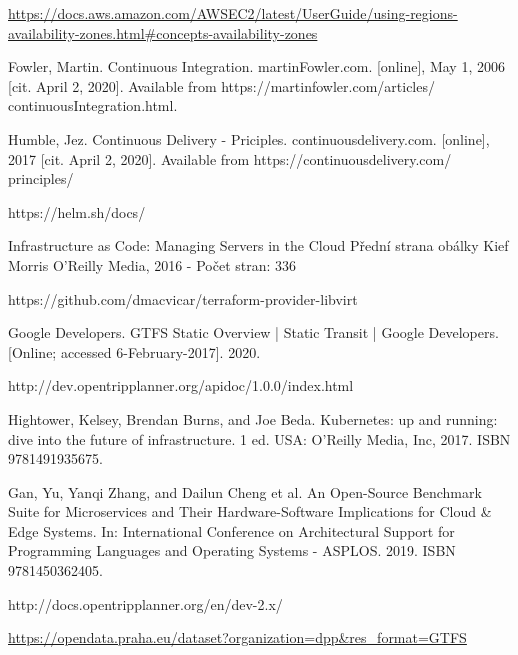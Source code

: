 \documentclass[thesis=M,czech]{FITthesis}[2019/12/23]
\theoremstyle{plain}
\theoremstyle{definition}
\begin{document}
\begin{thebibliography}{9}
\url{https://docs.aws.amazon.com/AWSEC2/latest/UserGuide/using-regions-availability-zones.html#concepts-availability-zones
}


Fowler, Martin. Continuous Integration. martinFowler.com. [online], May 1,
2006 [cit. April 2, 2020]. Available from https://martinfowler.com/articles/
continuousIntegration.html.


Humble, Jez. Continuous Delivery - Priciples. continuousdelivery.com. [online],
2017 [cit. April 2, 2020]. Available from https://continuousdelivery.com/
principles/

https://helm.sh/docs/



Infrastructure as Code: Managing Servers in the Cloud
Přední strana obálky
Kief Morris
O'Reilly Media, 2016 - Počet stran: 336


https://github.com/dmacvicar/terraform-provider-libvirt


Google Developers. GTFS Static Overview | Static Transit | Google Developers. [Online; accessed 6-February-2017]. 2020.


http://dev.opentripplanner.org/apidoc/1.0.0/index.html


Hightower, Kelsey, Brendan Burns, and Joe Beda. Kubernetes: up and running: dive into the future of infrastructure. 1 ed. USA: O’Reilly Media, Inc, 2017.
ISBN 9781491935675.



Gan, Yu, Yanqi Zhang, and Dailun Cheng et al. An Open-Source Benchmark
Suite for Microservices and Their Hardware-Software Implications for Cloud \&
Edge Systems. In: International Conference on Architectural Support for Programming Languages and Operating Systems - ASPLOS. 2019. ISBN 9781450362405.




http://docs.opentripplanner.org/en/dev-2.x/




\url{https://opendata.praha.eu/dataset?organization=dpp&res_format=GTFS}



\end{thebibliography}
\end{document}
